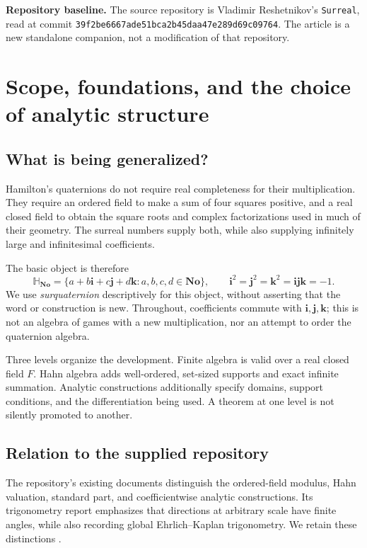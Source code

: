 \documentclass[11pt,letterpaper]{article}
\numberwithin{equation}{section}
\theoremstyle{definition}
\theoremstyle{remark}
\newcommand{\No}{\mathbf{No}}
\newcommand{\SQ}{\mathbb H_{\No}}
\newcommand{\ii}{\mathbf i}
\newcommand{\jj}{\mathbf j}
\newcommand{\kk}{\mathbf k}
\begin{document}
\begin{titlepage}
\begin{minipage}{0.95\textwidth}
\textbf{Repository baseline.} The source repository is Vladimir Reshetnikov's \texttt{Surreal},
read at commit \texttt{39f2be6667ade51bca2b45daa47e289d69c09764}.
The article is a new standalone companion, not a modification of that repository.
\end{minipage}
\end{titlepage}
\tableofcontents
\clearpage

\section{Scope, foundations, and the choice of analytic structure}\label{sec:scope}

\subsection{What is being generalized?}
Hamilton's quaternions do not require real completeness for their multiplication. They require
an ordered field to make a sum of four squares positive, and a real closed field to obtain the
square roots and complex factorizations used in much of their geometry. The surreal numbers
supply both, while also supplying infinitely large and infinitesimal coefficients.

The basic object is therefore
\[
 \SQ=\{a+b\ii+c\jj+d\kk:a,b,c,d\in\No\},\qquad
 \ii^2=\jj^2=\kk^2=\ii\jj\kk=-1.
\]
We use \emph{surquaternion} descriptively for this object, without asserting that the word or
construction is new. Throughout, coefficients commute with $\ii,\jj,\kk$; this is not an
algebra of games with a new multiplication, nor an attempt to order the quaternion algebra.

Three levels organize the development. Finite algebra is valid over a real closed field $F$.
Hahn algebra adds well-ordered, set-sized supports and exact infinite summation. Analytic
constructions additionally specify domains, support conditions, and the differentiation being
used. A theorem at one level is not silently promoted to another.

\subsection{Relation to the supplied repository}
The repository's existing documents distinguish the ordered-field modulus, Hahn valuation,
standard part, and coefficientwise analytic constructions. Its trigonometry report emphasizes
that directions at arbitrary scale have finite angles, while also recording global
Ehrlich--Kaplan trigonometry. We retain these distinctions
\cite{Repo,RepoDocs,RepoTrig}.
\end{document}
